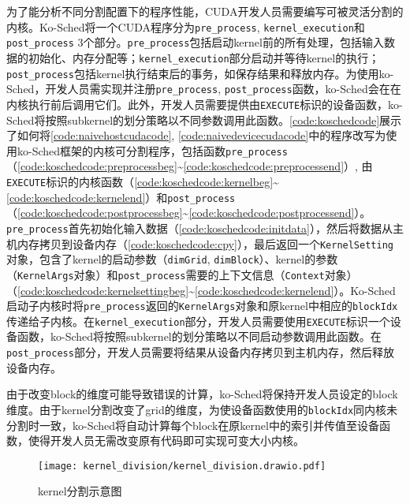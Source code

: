 为了能分析不同分割配置下的程序性能，CUDA开发人员需要编写可被灵活分割的内核。Ko-Sched将一个CUDA程序分为\texttt{pre\_process}, \texttt{kernel\_execution}和\texttt{post\_process} 3个部分。\texttt{pre\_process}包括启动kernel前的所有处理，包括输入数据的初始化、内存分配等；\texttt{kernel\_execution}部分启动并等待kernel的执行；\texttt{post\_process}包括kernel执行结束后的事务，如保存结果和释放内存。为使用ko-Sched，开发人员需实现并注册\texttt{pre\_process}, \texttt{post\_process}函数，ko-Sched会在在内核执行前后调用它们。此外，开发人员需要提供由\texttt{EXECUTE}标识的设备函数，ko-Sched将按照subkernel的划分策略以不同参数调用此函数。\autoref{code:koschedcode}展示了如何将\autoref{code:naivehostcudacode}, \autoref{code:naivedevicecudacode}中的程序改写为使用ko-Sched框架的内核可分割程序，包括函数\texttt{pre\_process}（\autoref{code:koschedcode:preprocessbeg}\textasciitilde\autoref{code:koschedcode:preprocessend}）, 由\texttt{EXECUTE}标识的内核函数（\autoref{code:koschedcode:kernelbeg}\textasciitilde\autoref{code:koschedcode:kernelend}）和\texttt{post\_process}（\autoref{code:koschedcode:postprocessbeg}\textasciitilde\autoref{code:koschedcode:postprocessend}）。\texttt{pre\_process}首先初始化输入数据（\autoref{code:koschedcode:initdata}），然后将数据从主机内存拷贝到设备内存（\autoref{code:koschedcode:cpy}），最后返回一个\texttt{KernelSetting}对象，包含了kernel的启动参数（\texttt{dimGrid}, \texttt{dimBlock}）、kernel的参数（\texttt{KernelArgs}对象）和\texttt{post\_process}需要的上下文信息（\texttt{Context}对象）（\autoref{code:koschedcode:kernelsettingbeg}\textasciitilde\autoref{code:koschedcode:kernelend}）。Ko-Sched启动子内核时将\texttt{pre\_process}返回的\texttt{KernelArgs}对象和原kernel中相应的\texttt{blockIdx}传递给子内核。在\texttt{kernel\_execution}部分，开发人员需要使用\texttt{EXECUTE}标识一个设备函数，ko-Sched将按照subkernel的划分策略以不同启动参数调用此函数。在\texttt{post\_process}部分，开发人员需要将结果从设备内存拷贝到主机内存，然后释放设备内存。

由于改变block的维度可能导致错误的计算，ko-Sched将保持开发人员设定的block维度。由于kernel分割改变了grid的维度，为使设备函数使用的\texttt{blockIdx}同内核未分割时一致，ko-Sched将自动计算每个block在原kernel中的索引并传值至设备函数，使得开发人员无需改变原有代码即可实现可变大小内核。

\begin{figure}[htbp]
    \centering
    \texttt{[image: kernel\_division/kernel\_division.drawio.pdf]}
    \caption{kernel分割示意图}
    \label{kernel-division}
\end{figure}

